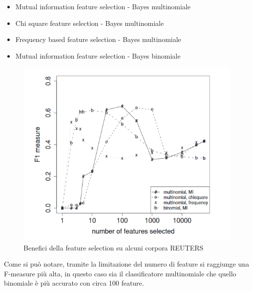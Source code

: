 \documentclass{article}
\theoremstyle{plain}
\theoremstyle{definition}
\begin{document}
\begin{itemize}  
\item Mutual information feature selection - Bayes multinomiale
\item Chi square feature selection - Bayes multinomiale
\item Frequency based feature selection - Bayes multinomiale
\item Mutual information feature selection - Bayes binomiale
\end{itemize}
\begin{figure}[htbp]
\begin{center}
\includegraphics[scale=0.80]{img/fselection.png}
\caption{Benefici della feature selection su alcuni corpora REUTERS}
\end{center}
\end{figure}
Come si può notare, tramite la limitazione del numero di feature si raggiunge una F-measure più alta, in questo caso sia il classificatore multinomiale che quello binomiale è più accurato con circa 100 feature.


\newpage
\end{document}
